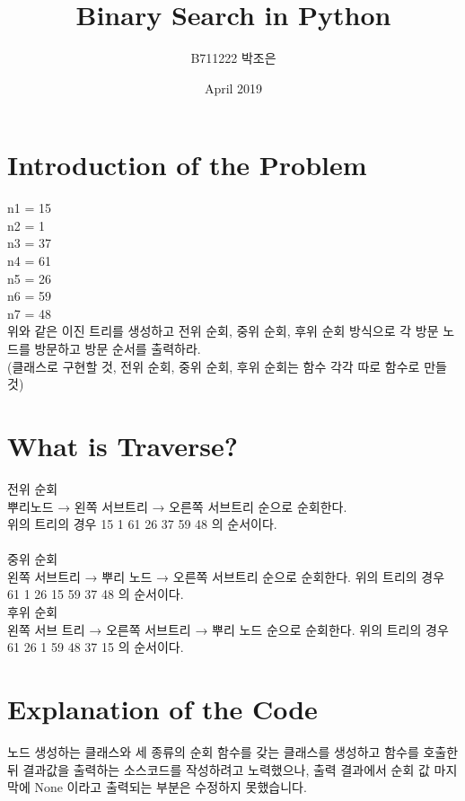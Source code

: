 \documentclass{article}
\begin{document}
\title{Binary Search in Python}
\author{B711222 박조은}
\date{April 2019}
\maketitle

\section{Introduction of the Problem}
n1 = 15\\
n2 = 1\\
n3 = 37\\
n4 = 61\\
n5 = 26\\
n6 = 59\\
n7 = 48\\
위와 같은 이진 트리를 생성하고 전위 순회, 중위 순회, 후위 순회 방식으로 각 방문 노드를 방문하고 방문 순서를 출력하라. \\
(클래스로 구현할 것, 전위 순회, 중위 순회, 후위 순회는 함수 각각 따로 함수로 만들 것)
\section{What is Traverse?}
전위 순회 \\
뿌리노드 → 왼쪽 서브트리 → 오른쪽 서브트리 순으로 순회한다. \\
위의 트리의 경우 15 1 61 26 37 59 48 의 순서이다.\\
\\
중위 순회 \\
왼쪽 서브트리 → 뿌리 노드 → 오른쪽 서브트리 순으로 순회한다. 위의 트리의 경우 61 1 26 15 59 37 48 의 순서이다.
\\
후위 순회\\
왼쪽 서브 트리 → 오른쪽 서브트리 → 뿌리 노드 순으로 순회한다. 위의 트리의 경우 61 26 1 59 48 37 15 의 순서이다.

\section{Explanation of the Code}
노드 생성하는 클래스와 세 종류의 순회 함수를 갖는 클래스를 생성하고 함수를 호출한 뒤 결과값을 출력하는 소스코드를 작성하려고 노력했으나, 출력 결과에서 순회 값 마지막에 None 이라고 출력되는 부분은 수정하지 못했습니다.
\end{document}
